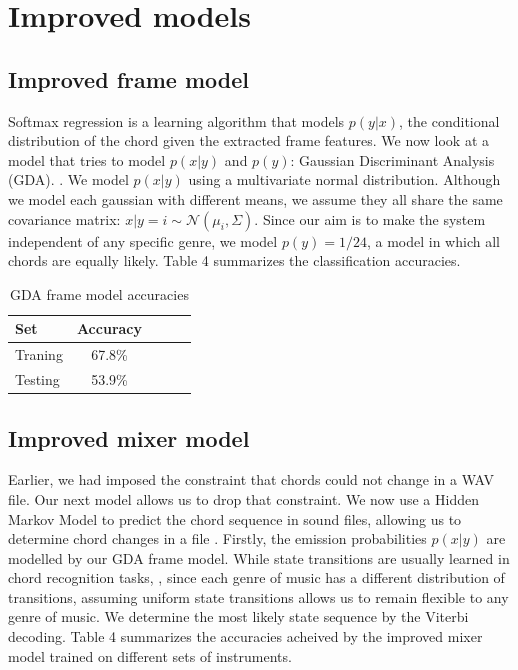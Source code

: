 \documentclass{article}
\begin{document}
\section{Improved models}
\subsection{Improved frame model}

Softmax regression is a learning algorithm that models $p(y|x)$, the conditional
distribution of the chord given the extracted frame features. We now look at a
model that tries to model $p(x|y)$ and $p(y)$: Gaussian Discriminant Analysis
(GDA). \cite{jiang}. We model $p(x|y)$ using a multivariate normal distribution.
Although we model each gaussian with different means, we assume they all share
the same covariance matrix: $x|y=i \sim \mathcal{N}$$(\mu_i, \Sigma)$. Since our
aim is to make the system independent of any specific genre, we model $p(y) =
1/24$, a model in which all chords are equally likely. Table 4 summarizes the classification accuracies.

\begin{table}[t]
\caption{GDA frame model accuracies}
\label{mfccvschroma}
\vskip 0.15in
\begin{center}
\begin{small}
\begin{sc}
\begin{tabular}{lcccr}
\hline
\abovespace\belowspace
Set & Accuracy \\
\hline
\abovespace
Traning & 67.8\%\\
Testing & 53.9\%\\
\hline
\end{tabular}
\end{sc}
\end{small}
\end{center}
\vskip -0.1in
\end{table}


\subsection{Improved mixer model}
Earlier, we had imposed the constraint that chords could not change in a WAV
file. Our next model allows us to drop that constraint. We now use a Hidden
Markov Model to predict the chord sequence in sound files, allowing us to
determine chord changes in a file \cite{sheh}. Firstly, the emission
probabilities $p(x|y)$ are modelled by our GDA frame model. While state
transitions are usually learned in chord recognition tasks, \cite{lee}, since
each genre of music has a different distribution of transitions, assuming
uniform state transitions allows us to remain flexible to any genre of music. We
determine the most likely state sequence by the Viterbi decoding. Table 4
summarizes the accuracies acheived by the improved mixer model trained on
different sets of instruments.
\end{document}
